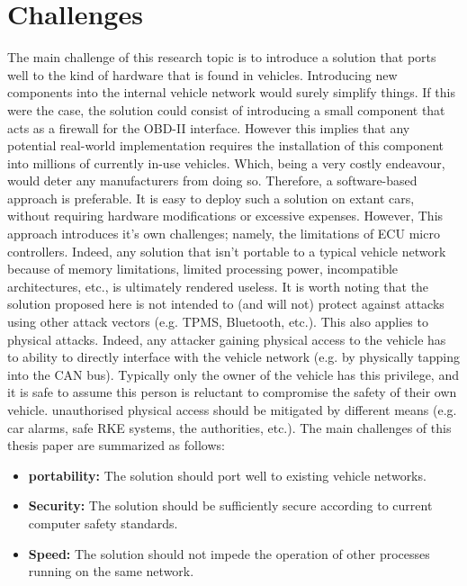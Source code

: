 \section{Challenges} \label{sec:challenges}
The main challenge of this research topic is to introduce a solution that ports well to the kind of hardware that is found in vehicles. Introducing new components into the internal vehicle network would surely simplify things. If this were the case, the solution could consist of introducing a small component that acts as a firewall for the OBD-II interface. However this implies that any potential real-world implementation requires the installation of this component into millions of currently in-use vehicles. Which, being a very costly endeavour, would deter any manufacturers from doing so. Therefore, a software-based approach is preferable. It is easy to deploy such a solution on extant cars, without requiring hardware modifications or excessive expenses. However, This approach introduces it's own challenges; namely, the limitations of ECU micro controllers. Indeed, any solution that isn't portable to a typical vehicle network because of memory limitations, limited processing power, incompatible architectures, etc., is ultimately rendered useless. It is worth noting that the solution proposed here is not intended to (and will not) protect against attacks using other attack vectors (e.g. TPMS, Bluetooth, etc.). This also applies to physical attacks. Indeed, any attacker gaining physical access to the vehicle has to ability to directly interface with the vehicle network (e.g. by physically tapping into the CAN bus). Typically only the owner of the vehicle has this privilege, and it is safe to assume this person is reluctant to compromise the safety of their own vehicle. unauthorised physical access should be mitigated by different means (e.g. car alarms, safe RKE systems, the authorities, etc.). The main challenges of this thesis paper are summarized as follows:

\begin{itemize}
	\item \textbf{portability:} The solution should port well to existing vehicle networks. 
	\item \textbf{Security:} The solution should be sufficiently secure according to current computer safety standards. 
	\item \textbf{Speed:} The solution should not impede the operation of other processes running on the same network.
\end{itemize}

